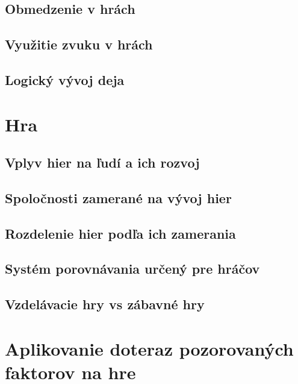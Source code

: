 \documentclass[10pt,twoside,slovak,a4paper]{article}
\begin{document}
\subsection{Obmedzenie v hrách}

\subsection{Využitie zvuku v hrách}

\subsection{Logický vývoj deja}



\section{Hra}

\subsection{Vplyv hier na ľudí a ich rozvoj}

\subsection{Spoločnosti zamerané na vývoj hier}

\subsection{Rozdelenie hier podľa ich zamerania}

\subsection{Systém porovnávania určený pre hráčov}

\subsection{Vzdelávacie hry vs zábavné hry}

\section{Aplikovanie doteraz pozorovaných faktorov na hre}


\end{document}
